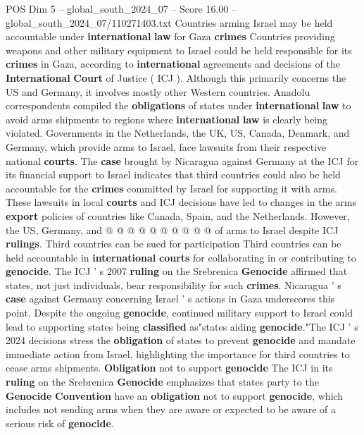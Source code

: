 \begin{textsample}{POS Dim 5 – global\_south\_2024\_07 – Score 16.00 – global\_south\_2024\_07/110271403.txt}  \label{ex:f5_pos_164}
Countries arming Israel may be held accountable under \textbf{international} \textbf{law} for Gaza \textbf{crimes} Countries providing weapons and other military equipment to Israel could be held responsible for its \textbf{crimes} in Gaza, according to \textbf{international} agreements and decisions of the \textbf{International} \textbf{Court} of Justice ( ICJ ).
Although this primarily concerns the US and Germany, it involves mostly other Western countries.
Anadolu correspondents compiled the \textbf{obligations} of states under \textbf{international} \textbf{law} to avoid arms shipments to regions where \textbf{international} \textbf{law} is clearly being violated.
Governments in the Netherlands, the UK, US, Canada, Denmark, and Germany, which provide arms to Israel, face lawsuits from their respective national \textbf{courts}.
The \textbf{case} brought by Nicaragua against Germany at the ICJ for its financial support to Israel indicates that third countries could also be held accountable for the \textbf{crimes} committed by Israel for supporting it with arms.
These lawsuits in local \textbf{courts} and ICJ decisions have led to changes in the arms \textbf{export} policies of countries like Canada, Spain, and the Netherlands.
However, the US, Germany, and @ @ @ @ @ @ @ @ @ @ of arms to Israel despite ICJ \textbf{rulings}.
Third countries can be sued for participation Third countries can be held accountable in \textbf{international} \textbf{courts} for collaborating in or contributing to \textbf{genocide}.
The ICJ ' s 2007 \textbf{ruling} on the Srebrenica \textbf{Genocide} affirmed that states, not just individuals, bear responsibility for such \textbf{crimes}.
Nicaragua ' s \textbf{case} against Germany concerning Israel ' s actions in Gaza underscores this point.
Despite the ongoing \textbf{genocide}, continued military support to Israel could lead to supporting states being \textbf{classified} as"states aiding \textbf{genocide}."The ICJ ' s 2024 decisions stress the \textbf{obligation} of states to prevent \textbf{genocide} and mandate immediate action from Israel, highlighting the importance for third countries to cease arms shipments. \textbf{Obligation} not to support \textbf{genocide} The ICJ in its \textbf{ruling} on the Srebrenica \textbf{Genocide} emphasizes that states party to the \textbf{Genocide} \textbf{Convention} have an \textbf{obligation} not to support \textbf{genocide}, which includes not sending arms when they are aware or expected to be aware of a serious risk of \textbf{genocide}.

\end{textsample}
